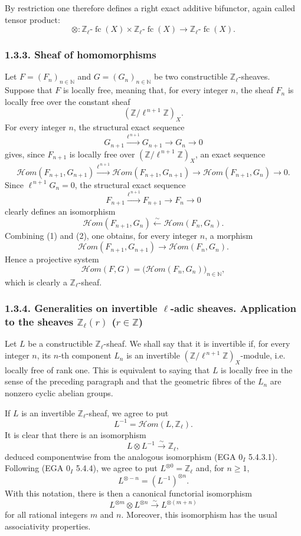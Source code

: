 \documentclass[11pt]{article}
\providecommand{\cHom}{\mathcal{H}om}
\providecommand{\fc}{\operatorname{fc}}
\begin{document}
By restriction one therefore defines a right exact additive bifunctor, again called tensor product:
\[
\otimes:\mathbb Z_\ell\text{-}\fc(X)\times \mathbb Z_\ell\text{-}\fc(X)
\longrightarrow \mathbb Z_\ell\text{-}\fc(X).
\]

\subsubsection*{1.3.3. Sheaf of homomorphisms}

Let \(F=(F_n)_{n\in\mathbb N}\) and \(G=(G_n)_{n\in\mathbb N}\) be two constructible \(\mathbb Z_\ell\)-sheaves. Suppose that \(F\) is locally free, meaning that, for every integer \(n\), the sheaf \(F_n\) is locally free over the constant sheaf
\[
(\mathbb Z/\ell^{\,n+1}\mathbb Z)_X.
\]
For every integer \(n\), the structural exact sequence
\[
G_{n+1}\xrightarrow{\ell^{\,n+1}}G_{n+1}\longrightarrow G_n\longrightarrow 0
\]
gives, since \(F_{n+1}\) is locally free over \((\mathbb Z/\ell^{\,n+1}\mathbb Z)_X\), an exact sequence
\[
\cHom(F_{n+1},G_{n+1})
 \xrightarrow{\ell^{\,n+1}}
\cHom(F_{n+1},G_{n+1})
 \longrightarrow
\cHom(F_{n+1},G_n)
 \longrightarrow 0.
\tag{1}
\]
Since \(\ell^{\,n+1}G_n=0\), the structural exact sequence
\[
F_{n+1}\xrightarrow{\ell^{\,n+1}}F_{n+1}\longrightarrow F_n\longrightarrow 0
\]
clearly defines an isomorphism
\[
\cHom(F_{n+1},G_n)\xleftarrow{\sim}\cHom(F_n,G_n).
\tag{2}
\]
Combining (1) and (2), one obtains, for every integer \(n\), a morphism
\[
\cHom(F_{n+1},G_{n+1})\longrightarrow \cHom(F_n,G_n).
\]
Hence a projective system
\[
\cHom(F,G)=\bigl(\cHom(F_n,G_n)\bigr)_{n\in\mathbb N},
\]
which is clearly a \(\mathbb Z_\ell\)-sheaf.

\subsubsection*{1.3.4. Generalities on invertible \(\ell\)-adic sheaves. Application to the sheaves \(\mathbb Z_\ell(r)\) (\(r\in\mathbb Z\))}

Let \(L\) be a constructible \(\mathbb Z_\ell\)-sheaf. We shall say that it is invertible if, for every integer \(n\), its \(n\)-th component \(L_n\) is an invertible \((\mathbb Z/\ell^{\,n+1}\mathbb Z)_X\)-module, i.e. locally free of rank one. This is equivalent to saying that \(L\) is locally free in the sense of the preceding paragraph and that the geometric fibres of the \(L_n\) are nonzero cyclic abelian groups.

If \(L\) is an invertible \(\mathbb Z_\ell\)-sheaf, we agree to put
\[
L^{-1}=\cHom(L,\mathbb Z_\ell).
\]
It is clear that there is an isomorphism
\[
L\otimes L^{-1}\xrightarrow{\sim}\mathbb Z_\ell,
\]
deduced componentwise from the analogous isomorphism (EGA \(0_I\) 5.4.3.1). Following (EGA \(0_I\) 5.4.4), we agree to put \(L^{\otimes0}=\mathbb Z_\ell\) and, for \(n\ge1\),
\[
L^{\otimes -n}=(L^{-1})^{\otimes n}.
\]
With this notation, there is then a canonical functorial isomorphism
\[
L^{\otimes m}\otimes L^{\otimes n}\xrightarrow{\sim}L^{\otimes(m+n)}
\]
for all rational integers \(m\) and \(n\). Moreover, this isomorphism has the usual associativity properties.
\end{document}

